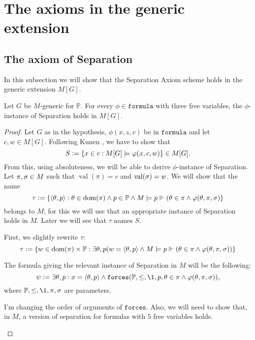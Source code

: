 \documentclass[11pt,english]{article}
\renewcommand{\PP}{\mathbb{P}}
\newcommand{\formula}{\ensuremath{\mathtt{formula}}}
\newcommand{\forceisa}{\mathtt{forces}}
\DeclareMathOperator{\val}{val}
\begin{document}
\section{The axioms in the generic extension}
\subsection{The axiom of Separation}
In this subsection we will show that the Separation Axiom scheme holds
in the generic extension $M[G]$. 

\begin{lemma}
  Let $G$ be $M$-generic for $\PP$. For every $\phi\in\formula$ with
  three free variables, the $\phi$-instance of Separation holds in
  $M[G]$.
\end{lemma}
\begin{proof}
  Let $G$ as in the hypothesis, $\phi(x,z,v)$ be in \formula{} and let
  $c,w\in M[G]$. Following Kunen \cite[Lemma IV.2.6]{kunen2011set},
  we have to show that 
  \[
  S\mathrel{\mathop:}=\{x\in c : M[G]\models \varphi(x,c,w)\} \in M[G].
  \]
  From this, using absoluteness, we will be able to derive
  $\phi$-instance of Separation. Let $\pi,\sigma\in M$ such that 
  $\val(\pi)=c$ and $\val(\sig)=w$.
  We will show that the name
  \[
  \tau \defi \{\lb\th,p\rb: \th\in\dom(\pi) \y p\in \PP\y
  M\models p\forces(\th\in\pi\y\phi(\th,\pi,\sig)\}
  \]
  belongs to $M$; for this we will use that an appropriate instance of
  Separation holds in $M$. Later we will see that $\tau$ names $S$.
  
  First, we slightly rewrite $\tau$:
  \[
  \tau \defi \{w\in\dom(\pi)\times\PP :\exists \th,p (w=\lb\th,p\rb \y 
  M\models p \forces(\th\in\pi\y\phi(\th,\pi,\sig))\}
  \]
  
  The formula giving the relevant instance of Separation in $M$ will be the
  following:
  \[
  \psi \defi \exists \th,p : x=\lb\th,p\rb \y \forceisa(\PP,\leq,\1,p,\th\in\pi\y\phi(\th,\pi,\sig)),
  \]
  where $\PP,\leq,\1,\pi,\sig$ are parameters.
  \begin{framed}
    I'm changing the order of arguments of $\forceisa$. Also, we
    will need to show that, in $M$, a version of separation for formulas
    with  $5$ free variables holds.


\end{framed}
\end{proof}
\end{document}
